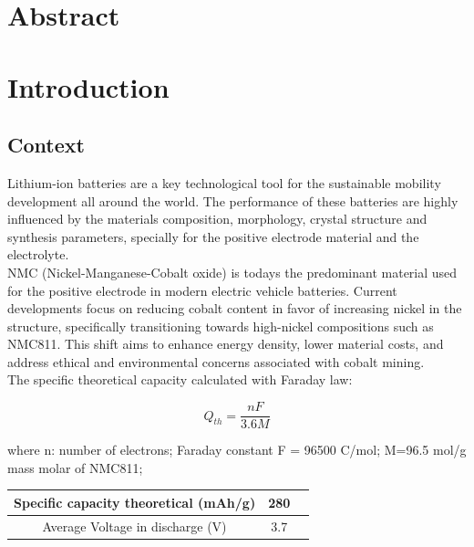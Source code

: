 \documentclass{article}
\begin{document}
\date{
  \vspace{2cm}
  \small{January 24, 2024}
}




\maketitle
\newpage
\setcounter{page}{1}  %
\tableofcontents

\newpage
\section{Abstract}
\section {Introduction}

\subsection{Context}

Lithium-ion batteries are a key technological tool for the sustainable mobility development all around the world. The performance of these batteries are highly influenced by the materials composition, morphology, crystal structure and synthesis parameters, specially for the positive electrode material and the electrolyte.\cite{topo} \\

NMC (Nickel-Manganese-Cobalt oxide) is todays the predominant material used for the positive electrode in modern electric vehicle batteries. Current developments focus on reducing cobalt content in favor of increasing nickel in the structure, specifically transitioning towards high-nickel compositions such as NMC811. This shift aims to enhance energy density, lower material costs, and address ethical and environmental concerns associated with cobalt mining. \cite{NMC811} \cite{NMCintro} \\

The specific theoretical capacity calculated with Faraday law:

\begin{equation}
Q_{th} = \frac{n F}{3.6 M} 
\end{equation}

where n: number of electrons;
Faraday constant F = 96500 C/mol;
M=96.5 mol/g mass molar of NMC811;

\begin{center}
  

\begin{tabular}{|c|c|c|}
  
  \hline
  Specific capacity
theoretical
(mAh/g) & 280  \\
  \hline
  Average Voltage in discharge (V) & 3.7  \\
  \hline
\end{tabular}
\end{center}
\end{document}
